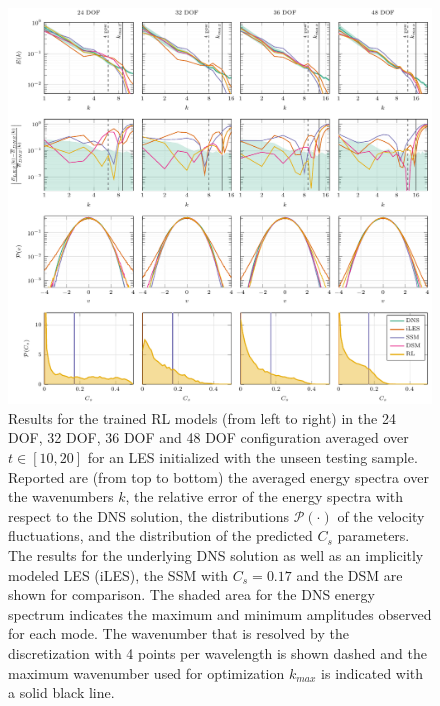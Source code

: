 \begin{figure}[htb!]
  \centering
  \includegraphics[width=\textwidth]{tikz_double_column/draft-figure3.pdf}
  \caption{Results for the trained RL models (from left to right) in the 24 DOF, 32 DOF, 36 DOF and 48 DOF configuration averaged over $t\in[10,20]$ for an LES initialized with the unseen testing sample. Reported are (from top to bottom) the averaged energy spectra over the wavenumbers $k$, the relative error of the energy spectra with respect to the DNS solution, the distributions $\mathcal{P}(\cdot)$ of the velocity fluctuations, and the distribution of the predicted $C_s$ parameters. The results for the underlying DNS solution as well as an implicitly modeled LES (iLES), the SSM with $C_s=0.17$ and the DSM are shown for comparison. The shaded area for the DNS energy spectrum indicates the maximum and minimum amplitudes observed for each mode. The wavenumber that is resolved by the discretization with 4 points per wavelength is shown dashed and the maximum wavenumber used for optimization $k_{max}$ is indicated with a solid black line.}
  \label{fig:spectra_n5}
\end{figure}

